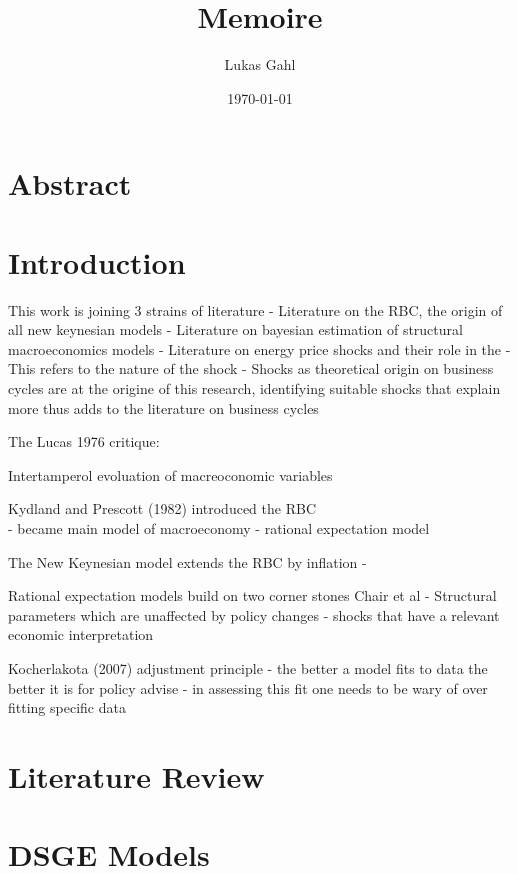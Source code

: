 \documentclass[12pt,a4paper,english]{article} %
\author{Lukas Gahl}
\title{\textbf{\huge Memoire }\\}
\date{\today}
\let\oldsection\section
\renewcommand\section{\clearpage\oldsection}
\begin{document}
	
	
	\maketitle
	\pagebreak

	\section*{Abstract}
	\pagebreak

	
	\tableofcontents
	\pagebreak
	
	
	 \section{Introduction}
	
	This work is joining 3 strains of literature
	- Literature on the RBC, the origin of all new keynesian models
	- Literature on bayesian estimation of structural macroeconomics models
	- Literature on energy price shocks and their role in the 
		- This refers to the nature of the shock
		- Shocks as theoretical origin on business cycles are at the origine of this research, 
		identifying suitable shocks that explain more thus adds to the literature on business cycles
	
	The Lucas 1976 critique: 
	
	Intertamperol evoluation of macreoconomic variables
	
	Kydland and Prescott (1982) introduced the RBC \\
	- became main model of macroeconomy
	- rational expectation model
	
	The New Keynesian model extends the RBC by inflation
	- 
	
	Rational expectation models build on two corner stones Chair et al
	- Structural parameters which are unaffected by policy changes
	- shocks that have a relevant economic interpretation
	
	Kocherlakota (2007) adjustment principle
	- the better a model fits to data the better it is for policy advise
	- in assessing this fit one needs to be wary of over fitting specific data
	
	\section{Literature Review}
	

	\section{DSGE Models}
	
\end{document}
